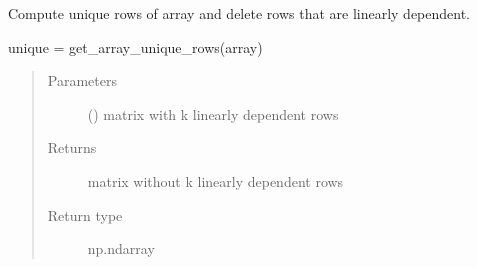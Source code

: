 \documentclass[letterpaper,10pt,english,openany,oneside]{sphinxmanual}
\begin{document}

\begin{fulllineitems}
\label{\detokenize{pygpc:pygpc.misc.get_array_unique_rows}}
Compute unique rows of array and delete rows that are linearly dependent.

unique = get\_array\_unique\_rows(array)
\begin{quote}\begin{description}
\item[{Parameters}] \leavevmode
{} () \textendash{} matrix with k linearly dependent rows

\item[{Returns}] \leavevmode
{} \textendash{} matrix without k linearly dependent rows

\item[{Return type}] \leavevmode
np.ndarray

\end{description}\end{quote}

\end{fulllineitems}

\end{document}

